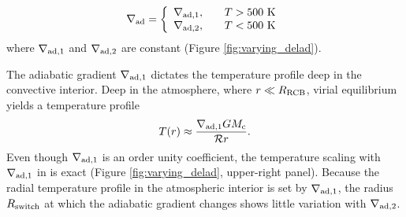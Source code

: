 \begin{equation}
\label{eq:deladvar}
\nabla_{\rm ad} = \left\{
\begin{array}{l l}
\nabla_{\rm ad, 1}, & \quad T > 500 \text{ K} \\
\nabla_{\rm ad, 2}, & \quad T < 500 \text{ K}
\end{array} 
\right.
\end{equation}   
where $\nabla_{\rm ad, 1}$ and $\nabla_{\rm ad,2}$ are constant (Figure \ref{fig:varying_delad}).






The adiabatic gradient $\nabla_{\rm ad,1}$ dictates the temperature profile deep in the convective interior.  Deep in the atmosphere, where $r \ll R_{\rm RCB}$, virial equilibrium yields a temperature profile 
\begin{equation}
\label{eq:Tdeep}
T(r) \approx \frac{\nabla_{\rm ad,1} G M_{\rm c}}{\mathcal{R} r}.
\end{equation}   
Even though $\nabla_{\rm ad,1}$ is an order unity coefficient, the temperature scaling with $\nabla_{\rm ad,1}$ in  is exact (Figure \ref{fig:varying_delad}, upper-right panel). Because the radial temperature profile in the atmospheric interior is set by $\nabla_{\rm ad,1}$, the radius $R_{\rm switch}$ at which the adiabatic gradient changes shows little variation with $\nabla_{\rm ad,2}$. %

